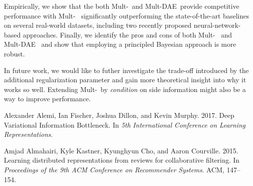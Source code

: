 \documentclass[sigconf]{acmart}
\newcommand{\mvae}{{\small Mult-}}
\newcommand{\mdae}{{\small Mult-}\gls{DAE}}
\begin{document}
Empirically, we show that the both \mvae~and \mdae~provide competitive performance with \mvae~ significantly outperforming the state-of-the-art baselines on several real-world datasets, including two recently proposed neural-network-based approaches. Finally, we identify the pros and cons of both \mvae~ and \mdae~ and show that employing a principled Bayesian approach is more robust.

In future work, we would like to futher investigate the trade-off introduced by the additional regularization parameter  and gain more theoretical insight into why it works so well. 
Extending \mvae~by \emph{condition} on side information might also be a way to improve performance. 
 


\begin{thebibliography}{54}


\ifx \showCODEN    \undefined {}     \fi
\ifx \showDOI      \undefined \def \showDOI       #1{#1}\fi
\ifx \showISBNx    \undefined \def \showISBNx     #1{\unskip}     \fi
\ifx \showISBNxiii \undefined \def \showISBNxiii  #1{\unskip}     \fi
\ifx \showISSN     \undefined \def \showISSN      #1{\unskip}     \fi
\ifx \showLCCN     \undefined \def \showLCCN      #1{\unskip}     \fi
\ifx \shownote     \undefined \def \shownote      #1{#1}          \fi
\ifx \showarticletitle \undefined \def \showarticletitle #1{#1}   \fi
\ifx \showURL      \undefined \def \showURL       {\relax}        \fi
\providecommand\bibfield[2]{#2}
\providecommand\bibinfo[2]{#2}
\providecommand\natexlab[1]{#1}
\providecommand\showeprint[2][]{arXiv:#2}

\bibfield{author}{\bibinfo{person}{Alexander Alemi}, \bibinfo{person}{Ian
  Fischer}, \bibinfo{person}{Joshua Dillon}, {and} \bibinfo{person}{Kevin
  Murphy}.} \bibinfo{year}{2017}\natexlab{}.
\newblock \showarticletitle{Deep Variational Information Bottleneck}. In
  \bibinfo{booktitle}{\emph{5th International Conference on Learning
  Representations}}.
\newblock


\bibfield{author}{\bibinfo{person}{Amjad Almahairi}, \bibinfo{person}{Kyle
  Kastner}, \bibinfo{person}{Kyunghyun Cho}, {and} \bibinfo{person}{Aaron
  Courville}.} \bibinfo{year}{2015}\natexlab{}.
\newblock \showarticletitle{Learning distributed representations from reviews
  for collaborative filtering}. In \bibinfo{booktitle}{\emph{Proceedings of the
  9th ACM Conference on Recommender Systems}}. ACM, \bibinfo{pages}{147--154}.
\newblock



\end{thebibliography}
\end{document}
